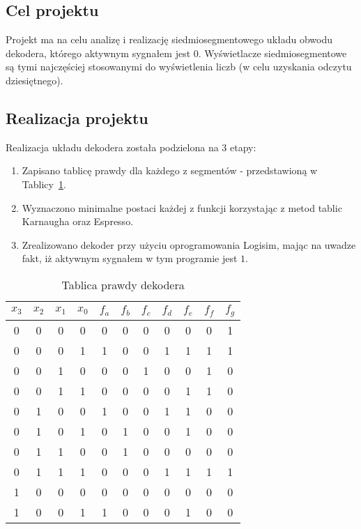 \subsection{Cel projektu}\label{subsec:intro-goal}
Projekt ma na celu analizę i realizację siedmiosegmentowego układu obwodu dekodera, którego aktywnym sygnałem jest $0$.
Wyświetlacze siedmiosegmentowe są tymi najczęściej stosowanymi do wyświetlenia liczb (w celu uzyskania odczytu dziesiętnego).

\subsection{Realizacja projektu}\label{subsec:intro-how}
Realizacja układu dekodera została podzielona na 3 etapy:
\begin{enumerate}
    \item Zapisano tablicę prawdy dla każdego z segmentów - przedstawioną w Tablicy~\ref{tab:truth-table}.
    \item Wyznaczono minimalne postaci każdej z funkcji korzystając z metod tablic Karnaugha oraz Espresso.
    \item Zrealizowano dekoder przy użyciu oprogramowania Logisim, mając na uwadze fakt,
    iż aktywnym sygnałem w tym programie jest $1$.
\end{enumerate}

\begin{table}[H]
    \centering
    \begin{tabular}{|c|c|c|c||c|c|c|c|c|c|c|}
        \hline
        $x_3$ & $x_2$ & $x_1$ & $x_0$ & $f_a$ & $f_b$ & $f_c$ & $f_d$ & $f_e$ & $f_f$ & $f_g$ \\ \hline
        \hline
        0     & 0     & 0     & 0     & 0     & 0     & 0     & 0     & 0     & 0     & 1     \\ \hline
        0     & 0     & 0     & 1     & 1     & 0     & 0     & 1     & 1     & 1     & 1     \\ \hline
        0     & 0     & 1     & 0     & 0     & 0     & 1     & 0     & 0     & 1     & 0     \\ \hline
        0     & 0     & 1     & 1     & 0     & 0     & 0     & 0     & 1     & 1     & 0     \\ \hline
        0     & 1     & 0     & 0     & 1     & 0     & 0     & 1     & 1     & 0     & 0     \\ \hline
        0     & 1     & 0     & 1     & 0     & 1     & 0     & 0     & 1     & 0     & 0     \\ \hline
        0     & 1     & 1     & 0     & 0     & 1     & 0     & 0     & 0     & 0     & 0     \\ \hline
        0     & 1     & 1     & 1     & 0     & 0     & 0     & 1     & 1     & 1     & 1     \\ \hline
        1     & 0     & 0     & 0     & 0     & 0     & 0     & 0     & 0     & 0     & 0     \\ \hline
        1     & 0     & 0     & 1     & 1     & 0     & 0     & 0     & 1     & 0     & 0     \\ \hline
    \end{tabular}
    \caption{Tablica prawdy dekodera}
    \label{tab:truth-table}
\end{table}